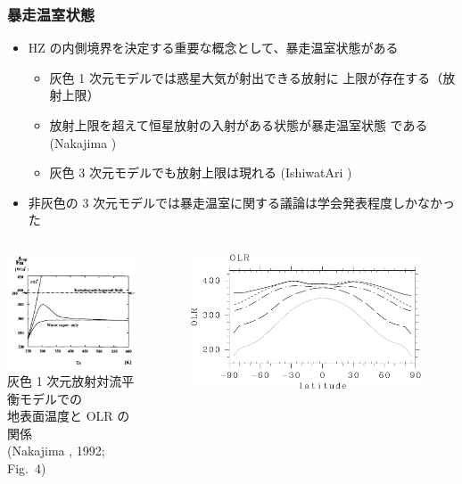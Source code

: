 \documentclass[aspectratio=149,9pt,fleqn]{beamer}
\begin{document}
\begin{frame}
	\frametitle{暴走温室状態}
	\begin{itemize}
		\item HZ の内側境界を決定する重要な概念として、暴走温室状態がある
			\begin{itemize}
				\item 灰色 1 次元モデルでは惑星大気が射出できる放射に
					上限が存在する（放射上限）
				\item 放射上限を超えて恒星放射の入射がある状態が暴走温室状態
					である (Nakajima )
				\item 灰色 3 次元モデルでも放射上限は現れる (IshiwatAri )
			\end{itemize}
		\item 非灰色の 3 次元モデルでは暴走温室に関する議論は学会発表程度しかなかった
	\end{itemize}
	\begin{columns}[b,onlytextwidth]
		\begin{column}{.45\textwidth}
				\centering\scriptsize
				\includegraphics[width=.8\textwidth]{nf4.png}\\
				灰色 1 次元放射対流平衡モデルでの\\
				地表面温度と OLR の関係\\
				(Nakajima \etal*, 1992; Fig.\ 4)
		\end{column}
		\begin{column}{.45\textwidth}
			\begin{figure}
				\centering\scriptsize
				\includegraphics[width=.8\textwidth]{i20024a.pdf}\\

\end{figure}
\end{column}
\end{columns}
\end{frame}
\end{document}
